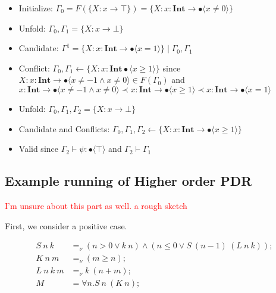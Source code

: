 \documentclass[runningheads]{llncs}
\newcommand\COL{\mathbin{:}}
\newcommand \stypeint {\textbf{Int}}
\newcommand \stypebool {\bullet}
\newcommand \typeint[1]{{#1} : \stypeint}
\newcommand \typebool[1]{\stypebool \langle #1 \rangle}
\begin{document}
\begin{itemize}
    \item Initialize: \(\Gamma_0 = F(\{X \COL x \rightarrow \top\}) = \{ X \COL
        \typeint{x} \to \typebool{x \neq 0} \} \)
    \item Unfold: \(\Gamma_0, \Gamma_1 = \{X \COL x \rightarrow \bot\}\)
    \item Candidate: \(\Gamma^1 = \{ X \COL \typeint{x} \to \typebool{x = 1} \} \mid \Gamma_0, \Gamma_1\)
    \item Conflict: \(\Gamma_0, \Gamma_1 \leftarrow \{X \COL \typeint{x}
        \typebool{x \geq 1}\}\)
        since \(X: \typeint{x} \to \typebool{x \neq -1 \land x \neq 0 } \in F(\Gamma_0)\) and \(
        \typeint{x} \to \typebool{x \neq -1 \land x \neq 0 } \prec \typeint{x} \to \typebool{x \geq 1} \prec \typeint{x} \to \typebool{x =
        1}\)
    \item Unfold: \(\Gamma_0, \Gamma_1, \Gamma_2 = \{X: x \rightarrow \bot\}\)
    \item Candidate and Conflicts: \(\Gamma_0, \Gamma_1, \Gamma_2 \leftarrow \{X
        \COL \typeint{x} \to \typebool{x \geq 1} \}\)
    \item Valid since \(\Gamma_2 \vdash \psi: \typebool{\top} \)
        and \(\Gamma_2 \vdash \Gamma_1 \)
\end{itemize}

\subsection{Example running of Higher order PDR}

\textcolor{red}{I'm unsure about this part as well. a rough sketch}

First, we consider a positive case.

\begin{align*}
    S\ n\ k\ &=_\nu (n > 0 \vee k\ n)
                    \wedge (n \leq 0 \vee S\ (n - 1)\ (L\ n\ k));\\
    K\ n\ m &=_\nu (m \geq n);\\
    L\ n\ k \ m &=_\nu k\ (n + m);\\
    M &= \forall n. S\ n\ (K\ n);
\end{align*}
\end{document}
